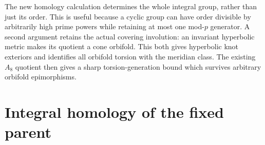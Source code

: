 \documentclass[11pt]{article}
\begin{document}
The new homology calculation determines the whole integral group,
rather than just its order. This is useful because a cyclic group can
have order divisible by arbitrarily high prime powers while retaining
at most one mod-$p$ generator. A second argument retains the actual
covering involution: an invariant hyperbolic metric makes its quotient
a cone orbifold. This both gives hyperbolic knot exteriors and identifies
all orbifold torsion with the meridian class. The existing $A_8$ quotient
then gives a sharp torsion-generation bound which survives arbitrary
orbifold epimorphisms.

\section{Integral homology of the fixed parent}
\end{document}
